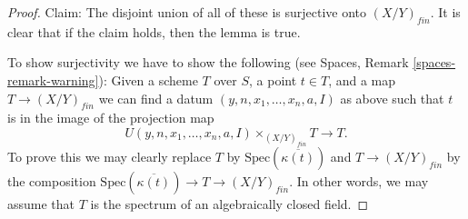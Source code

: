 \begin{proof}
\medskip\noindent
Claim: The disjoint union of all of these is surjective onto $(X/Y)_{fin}$.
It is clear that if the claim holds, then the lemma is true.

\medskip\noindent
To show surjectivity we have to show the following (see
Spaces, Remark \ref{spaces-remark-warning}): Given a scheme $T$ over
$S$, a point $t \in T$, and a map $T \to (X/Y)_{fin}$ we can find a datum
$(y, n, x_1, \ldots, x_n, a, I)$ as above such that
$t$ is in the image of the projection map
$$
U(y, n, x_1, \ldots, x_n, a, I) \times_{(X/Y)_{fin}} T \longrightarrow T.
$$
To prove this we may clearly replace $T$ by
$\text{Spec}(\overline{\kappa(t)})$ and
$T \to (X/Y)_{fin}$ by the composition
$\text{Spec}(\overline{\kappa(t)}) \to T \to (X/Y)_{fin}$.
In other words, we may assume that $T$ is
the spectrum of an algebraically closed field.


\end{proof}
